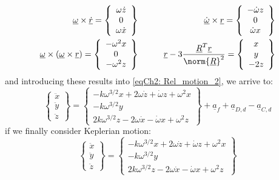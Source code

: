	\begin{align*}
	\underline{\omega}\times \underline{\dot{r}} = 
	\left\{ \begin{array}{c}
	\omega \dot{z} \\
	0 \\
	\omega \dot{x}
	\end{array}\right\} 
	& \qquad &
	\underline{\dot{\omega}} \times \underline{r} = 
	\left\{ \begin{array}{c}
	-\dot{\omega} z\\
	0 \\
	\dot{\omega} x
	\end{array}\right\} 
	\\
	\underline{\omega}\times\left(\underline{\omega} \times\underline{r}\right) = 
	\left\{ \begin{array}{c}
	- \omega^2 x \\
	0 \\
	- \omega^2 z 
	\end{array}\right\} 
	& \qquad &
	\underline{r} - 3 \dfrac{\underline{R}^T \underline{r}}{\norm{\underline{R}}^2} = 
	\left\{ \begin{array}{c}
	x \\
	y \\
	- 2 z 
	\end{array}\right\} 
	\end{align*}
	\noindent and introducing these results into \eqref{eqCh2: 	Rel_motion_2}, we arrive to:
	\begin{equation}
	\left\{
	\begin{array}{c}
	\ddot{x}\\
	\ddot{y}\\
	\ddot{z}
	\end{array}\right\}
	= 
	\left\{
	\begin{array}{c}
	- k \omega^{3/2} x + 2\omega \dot{z} + \dot{\omega} z + \omega^2 x	\\
	-k \omega^{3/2} y \\
	2k\omega^{3/2} z - 2 \omega \dot{x} - \dot{\omega} x + \omega^2 z
	\end{array}\right\}
	+ \underline{a}_f + \underline{a}_{D, d} - \underline{a}_{C, d}
	\label{eqCh2: Diff_eqs_prox_pert}
	\end{equation}
	\noindent if we finally consider Keplerian motion:
	\begin{equation}
	\left\{
	\begin{array}{c}
	\ddot{x}\\
	\ddot{y}\\
	\ddot{z}
	\end{array}\right\}
	= 
	\left\{
	\begin{array}{c}
	- k \omega^{3/2} x + 2\omega \dot{z} + \dot{\omega} z + \omega^2 x	\\
	-k \omega^{3/2} y \\
	2k\omega^{3/2} z - 2 \omega \dot{x} - \dot{\omega} x + \omega^2 z
	\end{array}\right\}
	\label{eqCh2: Diff_eqs_prox}
	\end{equation}
